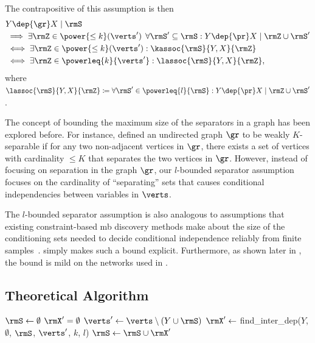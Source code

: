 \documentclass[accepted]{uai2026} %
\theoremstyle{plain}
\theoremstyle{definition}
\theoremstyle{remark}
\begin{document}
\begin{assumption}
  The contrapositive of this assumption is then
\begin{gather}
  \begin{aligned}
    &Y \dep{\gr} X \mid \rmS\\
    &\implies
      \exists \rmZ \in \power{\leq k}(\verts')\:\:
      \forall \rmS' \subseteq \rmS:
      Y \dep{\pr} X \mid \rmZ \cup \rmS'\\
    &\iff
      \exists \rmZ \in \power{\leq k}(\verts') :
      \kassoc{\rmS}{Y,X}{\rmZ}\\
    &\iff \exists \rmZ \in \powerleq{k}{\verts'} :
    \lassoc{\rmS}{Y,X}{\rmZ},
  \end{aligned}
\end{gather}
where
$\lassoc{\rmS}{Y,X}{\rmZ} \coloneq \forall \rmS' \in
\powerleq{l}{\rmS}: Y \dep{\pr} X \mid \rmZ \cup \rmS'$.
\end{assumption}

The concept of bounding the maximum size of the separators in a graph
has been explored before. For instance, \citet{soh2019} defined an
undirected graph $\gr$ to be weakly $K$-separable if for any two
non-adjacent vertices in $\gr$, there exists a set of vertices with
cardinality $\leq K$ that separates the two vertices in
$\gr$. However, instead of focusing on separation in the graph $\gr$,
our $l$-bounded separator assumption focuses on the cardinality of
``separating'' sets that causes conditional independencies between
variables in $\verts$.

The $l$-bounded separator assumption is also analogous to assumptions
that existing constraint-based \gls{mb} discovery methods make about the
size of the conditioning sets needed to decide conditional independence
reliably from finite samples~\citep{
  margaritis1999,tsamardinos2003,aliferis2003,tsamardinos2003b}.
 simply makes such a bound explicit.  Furthermore,
as shown later in , the bound is mild on the networks
used in .

\subsection{Theoretical Algorithm}
\begin{algorithm}[t]
  \caption{kOMB}\label{alg:komb}
  $\rmS \gets \emptyset$
  \Repeat
  {$\rmX' = \emptyset$}{
    $\verts' \gets \verts \setminus (Y \cup \rmS)$\;
    $\rmX' \gets $ find\_inter\_dep($Y$, $\emptyset$, $\rmS$, $\verts'$, $k$, $l$)\;
    $\rmS \gets \rmS \cup \rmX'$
  }
  \Return{$\rmS$}\;
\end{algorithm}
\end{document}
